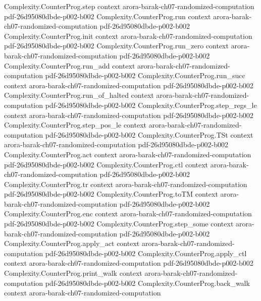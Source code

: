 \begin{theorem}
\proofstep
  {Complexity.CounterProg.step}
  {context}
  {arora-barak-ch07-randomized-computation}
  {pdf-26d95080dbde-p002-b002}
\proofstep
  {Complexity.CounterProg.run}
  {context}
  {arora-barak-ch07-randomized-computation}
  {pdf-26d95080dbde-p002-b002}
\proofstep
  {Complexity.CounterProg.init}
  {context}
  {arora-barak-ch07-randomized-computation}
  {pdf-26d95080dbde-p002-b002}
\proofstep
  {Complexity.CounterProg.run_zero}
  {context}
  {arora-barak-ch07-randomized-computation}
  {pdf-26d95080dbde-p002-b002}
\proofstep
  {Complexity.CounterProg.run_add}
  {context}
  {arora-barak-ch07-randomized-computation}
  {pdf-26d95080dbde-p002-b002}
\proofstep
  {Complexity.CounterProg.run_succ}
  {context}
  {arora-barak-ch07-randomized-computation}
  {pdf-26d95080dbde-p002-b002}
\proofstep
  {Complexity.CounterProg.run_of_halted}
  {context}
  {arora-barak-ch07-randomized-computation}
  {pdf-26d95080dbde-p002-b002}
\proofstep
  {Complexity.CounterProg.step_regs_le}
  {context}
  {arora-barak-ch07-randomized-computation}
  {pdf-26d95080dbde-p002-b002}
\proofstep
  {Complexity.CounterProg.step_pos_le}
  {context}
  {arora-barak-ch07-randomized-computation}
  {pdf-26d95080dbde-p002-b002}
\proofstep
  {Complexity.CounterProg.TSt}
  {context}
  {arora-barak-ch07-randomized-computation}
  {pdf-26d95080dbde-p002-b002}
\proofstep
  {Complexity.CounterProg.act}
  {context}
  {arora-barak-ch07-randomized-computation}
  {pdf-26d95080dbde-p002-b002}
\proofstep
  {Complexity.CounterProg.ctl}
  {context}
  {arora-barak-ch07-randomized-computation}
  {pdf-26d95080dbde-p002-b002}
\proofstep
  {Complexity.CounterProg.tr}
  {context}
  {arora-barak-ch07-randomized-computation}
  {pdf-26d95080dbde-p002-b002}
\proofstep
  {Complexity.CounterProg.toTM}
  {context}
  {arora-barak-ch07-randomized-computation}
  {pdf-26d95080dbde-p002-b002}
\proofstep
  {Complexity.CounterProg.enc}
  {context}
  {arora-barak-ch07-randomized-computation}
  {pdf-26d95080dbde-p002-b002}
\proofstep
  {Complexity.CounterProg.step_some}
  {context}
  {arora-barak-ch07-randomized-computation}
  {pdf-26d95080dbde-p002-b002}
\proofstep
  {Complexity.CounterProg.apply_act}
  {context}
  {arora-barak-ch07-randomized-computation}
  {pdf-26d95080dbde-p002-b002}
\proofstep
  {Complexity.CounterProg.apply_ctl}
  {context}
  {arora-barak-ch07-randomized-computation}
  {pdf-26d95080dbde-p002-b002}
\proofstep
  {Complexity.CounterProg.print_walk}
  {context}
  {arora-barak-ch07-randomized-computation}
  {pdf-26d95080dbde-p002-b002}
\proofstep
  {Complexity.CounterProg.back_walk}
  {context}
  {arora-barak-ch07-randomized-computation}

\end{theorem}
